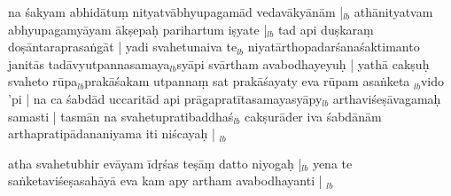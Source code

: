 \documentclass[article,12pt,a4paper]{memoir}%
\newcounter{parCount}
\begin{document}
	  
	  \pstart \leavevmode%
	na śakyam abhidātuṃ nityatvābhyupagamād vedavākyānām |{\tiny $_{lb}$} athānityatvam abhyupagamyāyam ākṣepaḥ parihartum iṣyate |{\tiny $_{lb}$} tad api duṣkaraṃ doṣāntaraprasaṅgāt | yadi svahetunaiva te{\tiny $_{lb}$} \leavevmode{} niyatārthopadarśanaśaktimanto janitās tadāvyutpannasamaya{\tiny $_{lb}$}syāpi svārtham avabodhayeyuḥ | yathā cakṣuḥ svaheto rūpa{\tiny $_{lb}$}prakāśakam utpannaṃ sat prakāśayaty eva rūpam asaṅketa \leavevmode{}{\tiny $_{lb}$}vido 'pi | na ca śabdād uccaritād api prāgapratītasamayasyāpy{\tiny $_{lb}$} arthaviśeṣāvagamaḥ samasti | tasmān na svahetupratibaddhaś{\tiny $_{lb}$} cakṣurāder iva śabdānām arthapratipādananiyama iti niścayaḥ |
	{}
	\pend%
      {\tiny $_{lb}$}

	  
	  \pstart \leavevmode%
	atha svahetubhir evāyam īdṛśas teṣāṃ datto niyogaḥ |{\tiny $_{lb}$} yena te saṅketaviśeṣasahāyā eva kam apy artham avabodhayanti |
	{}
	\pend%
      {\tiny $_{lb}$}
\end{document}
